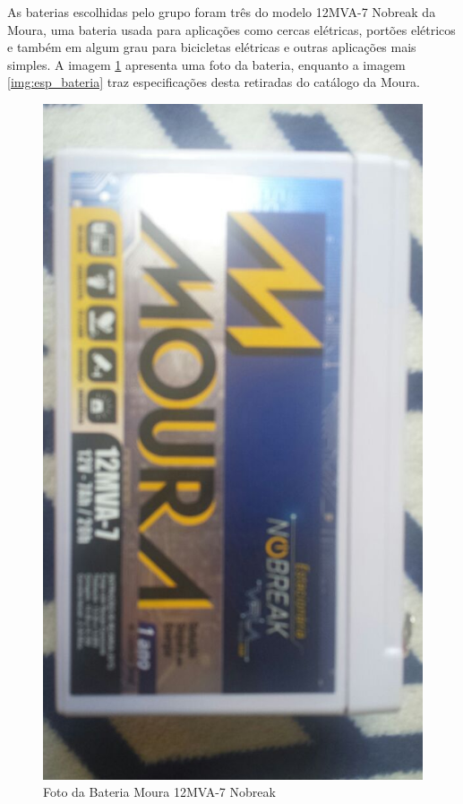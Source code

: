	As baterias escolhidas pelo grupo foram três do modelo 12MVA-7 Nobreak da Moura, uma bateria usada para aplicações como cercas elétricas, portões elétricos e também em algum grau para bicicletas elétricas e outras aplicações mais simples. A imagem \ref{img:bateria_moura} apresenta uma foto da bateria, enquanto a imagem \ref{img:esp_bateria} traz especificações desta retiradas do catálogo da Moura. 
	
	\graphicspath{{figuras/}}
	\begin{figure}[h!]
	\centering
	\includegraphics[scale=0.50]{bateria_bike}
	\caption{Foto da Bateria Moura 12MVA-7 Nobreak}
	\label{img:bateria_moura}
	\end{figure}
	
